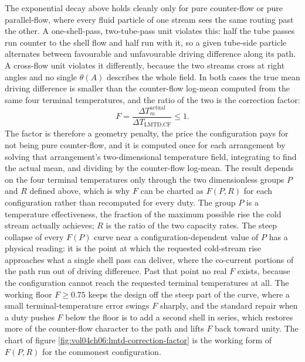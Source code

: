 The exponential decay above holds cleanly only for pure counter-flow or pure
parallel-flow, where every fluid particle of one stream sees the same routing past
the other. A one-shell-pass, two-tube-pass unit violates this: half the tube
passes run counter to the shell flow and half run with it, so a given tube-side
particle alternates between favourable and unfavourable driving difference along
its path. A cross-flow unit violates it differently, because the two streams cross
at right angles and no single $\theta(A)$ describes the whole field. In both cases
the true mean driving difference is smaller than the counter-flow log-mean computed
from the same four terminal temperatures, and the ratio of the two is the
correction factor:
\[
F = \frac{\Delta T_m^{\text{actual}}}{\Delta T_{\text{LMTD,CF}}} \le 1.
\]
The factor is therefore a geometry penalty, the price the configuration pays for not
being pure counter-flow, and it is computed once for each arrangement by solving
that arrangement's two-dimensional temperature field, integrating to find the
actual mean, and dividing by the counter-flow log-mean. The result depends on the
four terminal temperatures only through the two dimensionless groups $P$ and $R$
defined above, which is why $F$ can be charted as $F(P, R)$ for each configuration
rather than recomputed for every duty. The group $P$ is a temperature
effectiveness, the fraction of the maximum possible rise the cold stream actually
achieves; $R$ is the ratio of the two capacity rates. The steep collapse of every
$F(P)$ curve near a configuration-dependent value of $P$ has a physical reading: it
is the point at which the requested cold-stream rise approaches what a single shell
pass can deliver, where the co-current portions of the path run out of driving
difference. Past that point no real $F$ exists, because the configuration cannot
reach the requested terminal temperatures at all. The working floor $F \ge 0.75$
keeps the design off the steep part of the curve, where a small terminal-temperature
error swings $F$ sharply, and the standard repair when a duty pushes $F$ below the
floor is to add a second shell in series, which restores more of the counter-flow
character to the path and lifts $F$ back toward unity. The chart of figure
\ref{fig:vol04ch06:lmtd-correction-factor} is the working form of $F(P,R)$ for the
commonest configuration.



